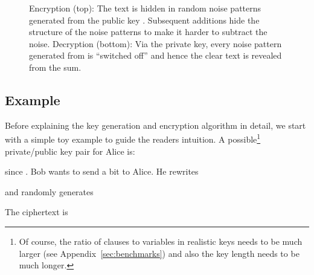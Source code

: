 \documentclass[final,journal,compsoc]{IEEEtran}
\begin{document}
\begin{figure*}
\begin{tikzpicture}[thick]
\end{tikzpicture}
\caption{Encryption (top): The text is hidden in random noise patterns
  generated from the public key . Subsequent additions hide the
  structure of the noise patterns to make it harder to subtract the
  noise.\newline
Decryption (bottom): Via the private key, every noise pattern generated
   from  is ``switched off'' and hence the clear text is
   revealed from the sum.
}
















































 \label{fig:encoding}
\end{figure*} 



\subsection{Example\label{sec:example}}

Before explaining the key generation and encryption algorithm in
detail, we start with a simple toy example to guide the readers
intuition.  A possible\footnote{Of course, the ratio of clauses to variables in
realistic keys needs to be much larger (see Appendix~\ref{sec:benchmarks}) and also the key length needs
to be much longer.} private/public key pair for Alice is:

since . Bob wants to send a bit  to
Alice. He rewrites

and randomly generates

The ciphertext is
\end{document}
